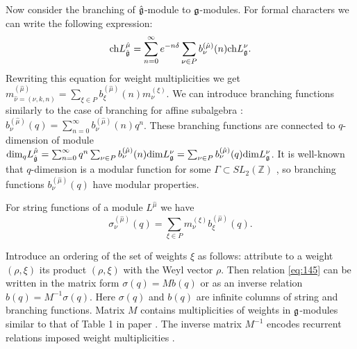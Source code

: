 Now consider the branching of $\hat{\mathfrak{g}}$-module to $\mathfrak{g}$-modules. For
formal characters we can write the following expression:
\begin{equation}
  \label{eq:8}
\mathrm{ch}L^{\hat{\mu}}_{\hat{\mathfrak{g}}}=\sum_{n=0}^{\infty}e^{-n\delta} \sum_{\nu\in P} b^{(\hat{\mu})}_{\nu}(n) \mathrm{ch} L^{\nu}_{\mathfrak{g}}.
\end{equation}
Rewriting this equation for weight multiplicities we get
$m^{(\hat{\mu})}_{\hat{\nu}=(\nu,k,n)}=\sum_{\xi\in P}
b^{(\hat{\mu})}_{\xi}(n) m^{(\xi)}_{\nu}$. We can introduce
branching functions similarly to the case of branching for affine
subalgebra \cite{kac1988modular,kac1990idl}:
$b^{(\hat{\mu})}_{\nu}(q)=\sum_{n=0}^{\infty}
b^{(\hat{\mu})}_{\nu}(n) q^{n}$.  These branching functions are connected to $q$-dimension of module $\mathrm{dim}_{q}L^{\hat \mu}_{\hat{\mathfrak{g}}}=\sum_{n=0}^{\infty}q^{n}\sum_{\nu\in P} b^{(\hat \mu)}_{\nu}(n) \mathrm{dim }L^{\nu}_{\mathfrak{g}}=\sum_{\nu\in P}b^{(\hat\mu)}_{\nu}(q) \mathrm{dim} L^{\nu}_{\mathfrak{g}}$. It is well-known that $q$-dimension is a modular function for some $\Gamma\subset SL_{2}(\mathbb{Z})$  \cite{gannon2006moonshine}, so branching functions $b^{(\hat \mu)}_{\nu}(q)$ have modular properties.

 For string functions of a module
$L^{\hat{\mu}}$ we have
\begin{equation}
  \label{eq:145}
   \sigma^{(\hat{\mu})}_{\nu}(q) = \sum_{\xi\in P} m^{(\xi)}_{\nu} b^{(\hat{\mu})}_{\xi}(q).
\end{equation}

Introduce an ordering of the set of weights $\xi$ as follows:
attribute to a weight $(\rho,\xi)$ its product $(\rho,\xi)$ with
the Weyl vector $\rho$. Then relation \eqref{eq:145} can be written
in the matrix form $\sigma(q)=M b(q)$ or as an inverse relation
$b(q)=M^{-1}\sigma(q)$. Here $\sigma(q)$ and $b(q)$ are infinite
columns of string and branching functions. Matrix $M$ contains
multiplicities of weights in $\mathfrak{g}$-modules similar to that of
Table 1 in paper \cite{2010arXiv1001}. The inverse matrix $M^{-1}$
encodes recurrent relations imposed weight multiplicities
\cite{il2010folded}.

